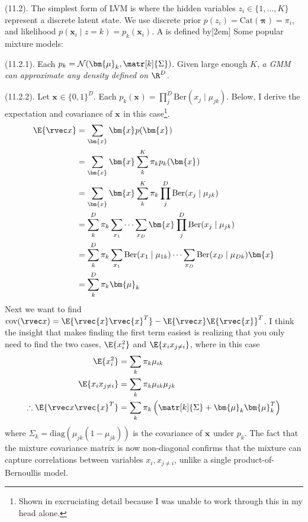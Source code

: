 \documentclass[11pt]{article}
\renewcommand\vec[2][]{\bm{#2}_{#1}}
\newcommand\myspace[1][]{\vspace{#1\bigskipamount}}
\newcommand\p{\Needspace{10\baselineskip} \noindent}
\begin{document}
\myspace
\p {} (11.2). The simplest form of LVM is where the hidden variables $z_i \in \{1, \ldots, K\}$ represent a discrete latent state. We use discrete prior $p(z_i) = \text{Cat}(\vec\pi) = \pi_i$, and likelihood $p(\vec[i]{x} \mid z{=}k) = p_k(\vec[i]{x})$. A  is defined by[2em]
\graybox{
	p(\vec[i]{x} \mid \vec\theta)
		&= \sum_{k=1}^{K} \pi_k p_k(\vec[i]{x} \mid \vec\theta)	
}
Some popular mixture models:
\begin{compactitem}
	\item {} (11.2.1). Each $p_k = \mathcal{N}(\vec[k]{\mu}, \matr[k]{\Sigma})$. Given large enough $K$, \textit{a GMM can approximate any density defined on $\R^D$.}
	
	\item {} (11.2.2). Let $\vec x \in \{0, 1\}^D$. Each $p_k(\vec x) = \prod_j^D \text{Ber}(x_j \mid \mu_{jk})$. Below, I derive the expectation and covariance of $\vec x$ in this case\footnote{Shown in excruciating detail because I was unable to work through this in my head alone.}. 
	\begin{align}
		\E{\rvec x}
			&= \sum_{\vec x} \vec{x} p(\vec x) \\
			&= \sum_{\vec x} \vec{x} \sum_k^K \pi_k p_k(\vec x) \\
			&= \sum_{\vec x} \vec{x} \sum_k^K \pi_k \prod_{j}^{D} \text{Ber}(x_j\mid \mu_{jk}) \\
			&= \sum_k^{D} \pi_k \sum_{x_1} \cdots \sum_{x_D} \vec x \prod_j^D \text{Ber}(x_j\mid \mu_{jk}) \\
			&= \sum_k^{D} \pi_k \sum_{x_1} \text{Ber}(x_1 \mid \mu_{1k}) \cdots \sum_{x_D} \text{Ber}(x_D \mid \mu_{Dk}) \vec x \\
			&= \sum_k^{D} \pi_k \vec[k]{\mu} 
	\end{align}
	Next we want to find $\text{cov}(\rvec x) = \E{\rvec{x}\rvec{x}^T} - \E{\rvec x}\E{\rvec{x}}^T$. I think the insight that makes finding the first term easiest is realizing that you only need to find the two cases, $\E{x_i^2}$ and $\E{x_i x_{j\ne i}}$, where in this case
	\begin{align}
		\E{x_i^2} &= \sum_k \pi_k \mu_{ik} \\
		\E{x_i x_{j \ne i}} &= \sum_k \pi_k \mu_{ik} \mu_{jk} \\
		\therefore \E{\rvec x \rvec{x}^T}
			&= \sum_k \pi_k \left( \matr[k]{\Sigma} + \vec[k]{\mu} \vec[k]{\mu}^T  \right)
	\end{align}
	where $\Sigma_k = \text{diag}(\mu_{jk}(1- \mu_{jk}))$ is the covariance of $\vec x$ under $p_k$. The fact that the mixture covariance matrix is now non-diagonal confirms that the mixture can capture correlations between variables $x_i, x_{j\ne i}$, unlike a single product-of-Bernoullis model.
	
\end{compactitem}
\end{document}
